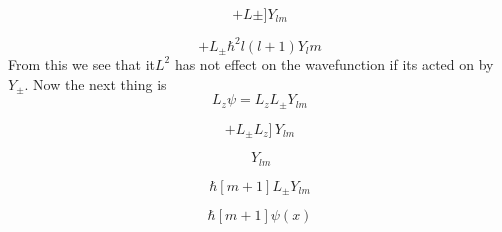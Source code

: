 \documentclass{article}
\begin{document}
\begin{equation}
 [[L^2,L_{\pm}]+L{\pm}]Y_{lm}
\end{equation}

\begin{equation}
 [0]+L_{\pm}\hbar^2 l(l+1)Y_lm
\end{equation}
From this we see that it$ L^2$ has not effect on the wavefunction if its acted on by $Y_{\pm}$. 
Now the next thing is 
\begin{equation}
L_z\psi=L_zL_{\pm}Y_{lm}
\end{equation}

\begin{equation}
[[L_z,L_{\pm}]+L_{\pm}L_z]\,Y_{lm}
\end{equation}

\begin{equation}
[\hbar L_{\pm}+L_{\pm}\hbar m]\,Y_{lm}
\end{equation}

\begin{equation}
\hbar [m+1]L_{\pm}Y_{lm}
\end{equation}

\begin{equation}
 \hbar [m+1] \psi(x)
\end{equation}
\end{document}

